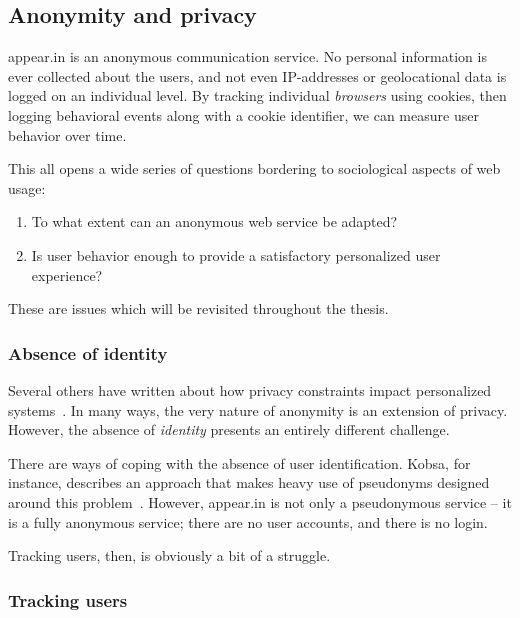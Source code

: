\subsection{Anonymity and privacy}
\label{sub:anonymity_privacy}

appear.in is an anonymous communication service. No personal information is ever collected about the users, and not even IP-addresses or geolocational data is logged on an individual level. By tracking individual \emph{browsers} using cookies, then logging behavioral events along with a cookie identifier, we can measure user behavior over time.

This all opens a wide series of questions bordering to sociological aspects of web usage:

\begin{enumerate}
  \item
    To what extent can an anonymous web service be adapted?
  \item
    Is user behavior enough to provide a satisfactory personalized user experience?
\end{enumerate}

These are issues which will be revisited throughout the thesis.

\subsubsection{Absence of identity} %

Several others have written about how privacy constraints impact personalized systems~\cite{Teltzrow2004,Kobsa2007}. In many ways, the very nature of anonymity is an extension of privacy. However, the absence of \emph{identity} presents an entirely different challenge.

There are ways of coping with the absence of user identification. Kobsa, for instance, describes an approach that makes heavy use of pseudonyms designed around this problem~\cite{Kobsa2003}.
However, appear.in is not only a pseudonymous service -- it is a fully anonymous service; there are no user accounts, and there is no login.

Tracking users, then, is obviously a bit of a struggle.

\subsubsection{Tracking users}

